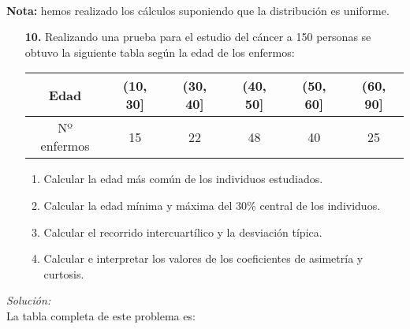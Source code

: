 \documentclass[11pt,a4paper]{article}
\theoremstyle{definition}
\begin{document}
\hspace{1cm} \\
\small {\textbf {Nota:} hemos realizado los cálculos suponiendo que la distribución es uniforme.} 



\pagebreak

\begin{itemize}
	\item[\textbf{10.}] Realizando una prueba para el estudio del cáncer a 150 personas se obtuvo la siguiente tabla según la edad de los enfermos:


\begin{table}[!htbp]
\hspace{2.7cm}
\begin{tabular}{|c|c|c|c|c|c|}
\hline
Edad & (10, 30] & (30, 40] & (40, 50] & (50, 60] & (60, 90] \\ \hline
Nº enfermos & 15 & 22 & 48 & 40 & 25 \\ \hline
\end{tabular}
\end{table}
	\begin{enumerate}[label=\emph{\alph*})]
		\item Calcular la edad más común de los individuos estudiados.
		\item Calcular la edad mínima y máxima del 30\% central de los individuos.
		\item Calcular el recorrido intercuartílico y la desviación típica.
		\item Calcular e interpretar los valores de los coeficientes de asimetría y curtosis.
	\end{enumerate}
\end{itemize}

{\color{grey}\hrulefill}

\emph{Solución:} \\ 

La tabla completa de este problema es:
\end{document}
